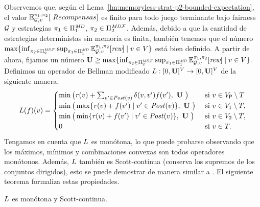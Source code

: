 Observemos que, según el Lema~\ref{lm:memoryless-strat-p2-bounded-expectation}, el valor $\Expect{\strat{1}}{\strat{2}}_{\StochG,v}[\ Recompensas]$ es finito
para todo juego terminante bajo fairness $\mathcal{G}$ y estrategias $\pi_{1} \in \Pi^{\textit{MD}}_{1}$, $\pi_{2} \in \Pi^{\textit{MD}\mathcal{F}}_{2}$.
Además, debido a que la cantidad de estrategias deterministas sin memoria es finita, también tenemos que el número $\max \{ \inf_{\pi_{2} \in \Pi^{\textit{MD}\mathcal{F}}_{2}} \sup_{\pi_{1} \in \Pi^{\textit{MD}}_{1}} \mathbb{E}^{\pi_{1}, \pi_{ 2}}_{\mathcal{G},v}[\textit{rew}] \mid v \in V \}$ está bien definido.
A partir de ahora, fijamos un número $\mathbf{U} \geq \max \{ \inf_{\pi_{2} \in \Pi^{\textit{MD}\mathcal{F}}_{2}} \sup_{\pi_{1} \in \Pi^{\textit{MD}}_{1}} \mathbb{E}^{\pi_{1}, \pi_{2}}_{\mathcal{G},v}[\textit{rew}] \mid v \in V \}$. Definimos un operador de Bellman modificado $L: [0,\mathbf{U}]^V \rightarrow [0,\mathbf{U}]^V$ de la siguiente manera.
\[
    \Bellman(f)(v) =
    \begin{cases}
          \min \big( \reward(v) + \sum_{v' \in \post(v)} \delta(v,v')  f(v'),  \ \UpperBound \ \big ) &  \text{ si } v \in V_\Probabilistic \setminus T  \\
          \min\big( \max\{\reward(v)  + f(v') \mid v' \in \post(v) \}, \ \UpperBound  \ \big)& \text{ si } v \in  V_1 \setminus T, \\
          \min\big( \min\{\reward(v)  + f(v') \mid v' \in \post(v) \}, \ \UpperBound \ \big) & \text{ si } v \in  V_2 \setminus T, \\
           0 & \text{ si } v \in T.
    \end{cases}
\]
Tengamos en cuenta que $L$ es monótona, lo que puede probarse observando que los máximos, mínimos y combinaciones convexas son todos operadores monótonos.
Además, $L$ también es Scott-continua (conserva los supremos de los conjuntos dirigidos), esto se puede demostrar de manera similar a \cite{DBLP:conf/memics/BrazdilKN12}. El siguiente teorema
formaliza estas propiedades.
\begin{proposition}\label{pn:continuity} $L$ es monótona y Scott-continua.
\end{proposition}

